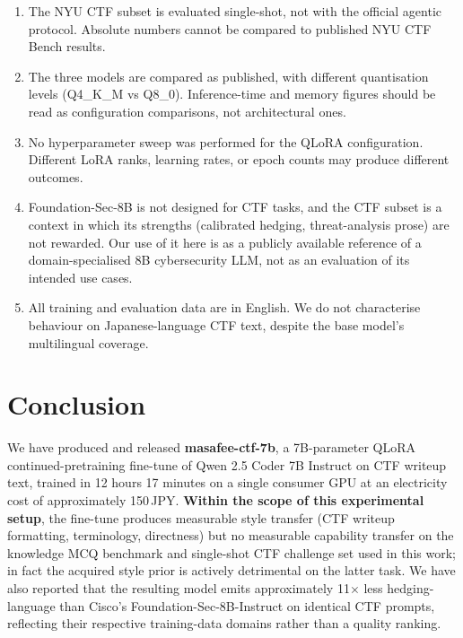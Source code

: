 \documentclass[10pt,twocolumn,a4paper]{article}
\begin{document}
\begin{enumerate}
\item The NYU CTF subset is evaluated single-shot, not with the official agentic protocol. Absolute numbers cannot be compared to published NYU CTF Bench results.
\item The three models are compared as published, with different quantisation levels (Q4{\_}K{\_}M vs Q8{\_}0). Inference-time and memory figures should be read as configuration comparisons, not architectural ones.
\item No hyperparameter sweep was performed for the QLoRA configuration. Different LoRA ranks, learning rates, or epoch counts may produce different outcomes.
\item Foundation-Sec-8B is not designed for CTF tasks, and the CTF subset is a context in which its strengths (calibrated hedging, threat-analysis prose) are not rewarded. Our use of it here is as a publicly available reference of a domain-specialised 8B cybersecurity LLM, not as an evaluation of its intended use cases.
\item All training and evaluation data are in English. We do not characterise behaviour on Japanese-language CTF text, despite the base model's multilingual coverage.
\end{enumerate}

\section{Conclusion}

We have produced and released \textbf{masafee-ctf-7b}, a 7B-parameter QLoRA continued-pretraining fine-tune of Qwen 2.5 Coder 7B Instruct on CTF writeup text, trained in 12 hours 17 minutes on a single consumer GPU at an electricity cost of approximately 150\,JPY. \textbf{Within the scope of this experimental setup}, the fine-tune produces measurable style transfer (CTF writeup formatting, terminology, directness) but no measurable capability transfer on the knowledge MCQ benchmark and single-shot CTF challenge set used in this work; in fact the acquired style prior is actively detrimental on the latter task. We have also reported that the resulting model emits approximately 11$\times$ less hedging-language than Cisco's Foundation-Sec-8B-Instruct on identical CTF prompts, reflecting their respective training-data domains rather than a quality ranking.
\end{document}
